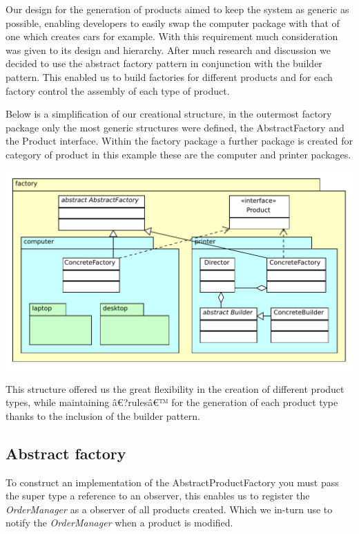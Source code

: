 \documentclass[pdftex,11pt,a4paper]{article}
\begin{document}
Our design for the generation of products aimed to keep the system as generic as possible, enabling developers to easily swap the computer package with that of one which creates cars for example. With this requirement much consideration was given to its design and hierarchy. After much research and discussion we decided to use the abstract factory pattern in conjunction with the builder pattern. This enabled us to build factories for different products and for each factory control the assembly of each type of product.

Below is a simplification of our creational structure, in the outermost factory package only the most generic structures were defined, the AbstractFactory and the Product interface. Within the factory package a further package is created for category of product in this example these are the computer and printer packages.

\begin{center}
	\includegraphics[scale=0.75]{images/creational_diagram.pdf}
\end{center}

This structure offered us the great flexibility in the creation of different product types, while maintaining â€?rulesâ€™ for the generation of each product type thanks to the inclusion of the builder pattern.

\subsection{Abstract factory}

To construct an implementation of the AbstractProductFactory you must pass the super type a reference to an observer, this enables us to register the \emph{OrderManager} as a observer of all products created. Which we in-turn use to notify the \emph{OrderManager} when a product is modified.
\end{document}
